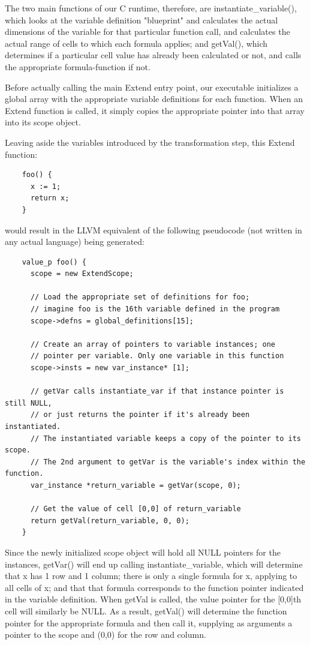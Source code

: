   The two main functions of our C runtime, therefore, are instantiate\_variable(), which looks at the variable definition "blueprint" and calculates the actual dimensions of the variable for that particular function call, and calculates the actual range of cells to which each formula applies; and getVal(), which determines if a particular cell value has already been calculated or not, and calls the appropriate formula-function if not.

  Before actually calling the main Extend entry point, our executable initializes a global array with the appropriate variable definitions for each function. When an Extend function is called, it simply copies the appropriate pointer into that array into its scope object.

  Leaving aside the variables introduced by the transformation step, this Extend function:
  \begin{lstlisting}
    foo() {
      x := 1;
      return x;
    }
  \end{lstlisting}
  \medskip \noindent
  would result in the LLVM equivalent of the following pseudocode (not written in any actual language) being generated:

  \begin{lstlisting}
    value_p foo() {
      scope = new ExtendScope;

      // Load the appropriate set of definitions for foo;
      // imagine foo is the 16th variable defined in the program
      scope->defns = global_definitions[15];

      // Create an array of pointers to variable instances; one
      // pointer per variable. Only one variable in this function
      scope->insts = new var_instance* [1];

      // getVar calls instantiate_var if that instance pointer is still NULL,
      // or just returns the pointer if it's already been instantiated.
      // The instantiated variable keeps a copy of the pointer to its scope.
      // The 2nd argument to getVar is the variable's index within the function.
      var_instance *return_variable = getVar(scope, 0);

      // Get the value of cell [0,0] of return_variable
      return getVal(return_variable, 0, 0);
    }
  \end{lstlisting}
  \medskip \noindent

  Since the newly initialized scope object will hold all NULL pointers for the instances, getVar() will end up calling instantiate\_variable, which will  determine that x has 1 row and 1 column; there is only a single formula for x, applying to all cells of x; and that that formula corresponds to the function pointer indicated in the variable definition.
  When getVal is called, the value pointer for the [0,0]th cell will similarly be NULL. As a result, getVal() will determine the function pointer for the appropriate formula and then call it, supplying as arguments a pointer to the scope and (0,0) for the row and column.


